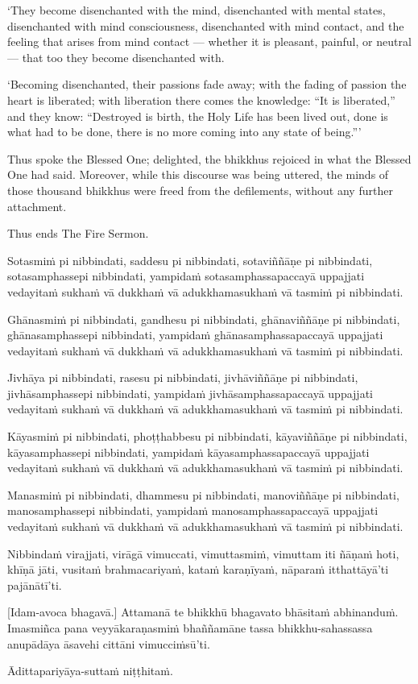 ‘They become disenchanted with the mind, disenchanted with mental
states, disenchanted with mind consciousness, disenchanted with mind
contact, and the feeling that arises from mind contact --- whether it is
pleasant, painful, or neutral --- that too they become disenchanted with.

‘Becoming disenchanted, their passions fade away; with the fading of
passion the heart is liberated; with liberation there comes the
knowledge: “It is liberated,” and they know: “Destroyed is birth, the
Holy Life has been lived out, done is what had to be done, there is no
more coming into any state of being.”\thinspace ’

\enlargethispage{\baselineskip}

Thus spoke the Blessed One; delighted, the bhikkhus rejoiced in what the
Blessed One had said. Moreover, while this discourse was being uttered, the
minds of those thousand bhikkhus were freed from the defilements,
without any further attachment.

Thus ends The Fire Sermon.

\clearpage

\paliText
\markboth{\paliTitle}{\rightmark}

Sotasmiṁ pi nibbindati, saddesu pi nibbindati, sotaviññāṇe pi
nibbindati, sotasamphassepi nibbindati, yampidaṁ sotasamphassapaccayā
uppajjati vedayitaṁ sukhaṁ vā dukkhaṁ vā adukkhamasukhaṁ vā tasmiṁ pi
nibbindati.

Ghānasmiṁ pi nibbindati, gandhesu pi nibbindati, ghānaviññāṇe pi
nibbindati, ghānasamphassepi nibbindati, yampidaṁ ghānasamphassapaccayā
uppajjati vedayitaṁ sukhaṁ vā dukkhaṁ vā adukkhamasukhaṁ vā tasmiṁ pi
nibbindati.

Jivhāya pi nibbindati, rasesu pi nibbindati, jivhāviññāṇe pi nibbindati,
jivhāsamphassepi nibbindati, yampidaṁ jivhāsamphassapaccayā uppajjati
vedayitaṁ sukhaṁ vā dukkhaṁ vā adukkhamasukhaṁ vā tasmiṁ pi nibbindati.

Kāyasmiṁ pi nibbindati, phoṭṭhabbesu pi nibbindati, kāyaviññāṇe pi
nibbindati, kāyasamphassepi nibbindati, yampidaṁ kāyasamphassapaccayā
uppajjati vedayitaṁ sukhaṁ vā dukkhaṁ vā adukkhamasukhaṁ vā tasmiṁ pi
nibbindati.

Manasmiṁ pi nibbindati, dhammesu pi nibbindati, manoviññāṇe pi
nibbindati, manosamphassepi nibbindati, yampidaṁ manosamphassapaccayā
uppajjati vedayitaṁ sukhaṁ vā dukkhaṁ vā adukkhamasukhaṁ vā tasmiṁ pi
nibbindati.

Nibbindaṁ virajjati, virāgā vimuccati, vimuttasmiṁ, vimuttam iti ñāṇaṁ
hoti, khīṇā jāti, vusitaṁ brahmacariyaṁ, kataṁ karaṇīyaṁ, nāparaṁ
itthattāyā'ti pajānātī'ti.

\enlargethispage{\baselineskip}

[Idam-avoca bhagavā.] Attamanā te bhikkhū bhagavato bhāsitaṁ abhinanduṁ.
Imasmiñca pana veyyākaraṇasmiṁ bhaññamāne tassa bhikkhu-sahassassa
anupādāya āsavehi cittāni vimucciṁsū'ti.

Ādittapariyāya-suttaṁ niṭṭhitaṁ.

\resumeNormalText

